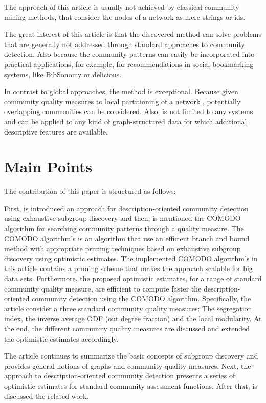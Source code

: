 \documentclass[a4paper]{article}
\begin{document}
The approach of this article is usually not achieved by classical community mining methods, that consider the nodes of a network as mere strings or ids.
\vskip 0.3cm

The great interest of this article is that the discovered method can solve problems that are generally not addressed through standard approaches to community detection. Also because the community patterns can easily be incorporated into practical applications, for example, for recommendations in social bookmarking systems, like BibSonomy or delicious.
\vskip 0.3cm

In contrast to global approaches, the method is exceptional. Because given community quality measures to local partitioning of a network , potentially overlapping communities can be considered. Also, is not limited to any systems and can be applied to any kind of graph-structured data for which additional descriptive features are available.

\section{Main Points}
The contribution of this paper is structured as follows:
\vskip 0.3cm

First, is introduced an approach for description-oriented community detection using exhaustive subgroup discovery and then, is mentioned the COMODO algorithm for searching community patterns through a quality measure. The COMODO algorithm's is an algorithm that use an efficient branch and bound method with appropriate pruning techniques based on exhaustive subgroup discovery using optimistic estimates. The implemented COMODO algorithm's in this article contains a pruning scheme that makes the approach scalable for big data sets. Furthermore, the proposed optimistic estimates, for a range of standard community quality measure, are efficient to compute faster the description-oriented community detection using the COMODO algorithm. Specifically, the article consider a three standard community quality measures: The segregation index, the inverse average ODF (out degree fraction) and the local modularity. At the end, the different community quality measures are discussed and extended the optimistic estimates accordingly. 
\vskip 0.3cm

The article continues to summarize the basic concepts of subgroup discovery and provides general notions of graphs and community quality measures. Next, the approach to description-oriented community detection presents a series of optimistic estimates for standard community assessment functions. After that, is discussed the related work.
\vskip 0.3cm
\end{document}
